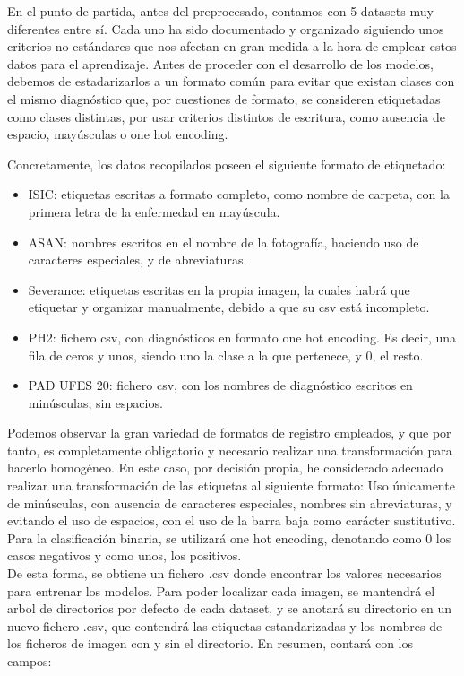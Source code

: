 En el punto de partida, antes del preprocesado, contamos con 5 datasets muy diferentes entre sí. Cada uno ha sido documentado y organizado siguiendo unos criterios no estándares que nos afectan en gran medida a la hora de emplear estos datos para el aprendizaje. Antes de proceder con el desarrollo de los modelos, debemos de estadarizarlos a un formato común para evitar que existan clases con el mismo diagnóstico que, por cuestiones de formato, se consideren etiquetadas como clases distintas, por usar criterios distintos de escritura, como ausencia de espacio, mayúsculas o one hot encoding. 

Concretamente, los datos recopilados poseen el siguiente formato de etiquetado:
\begin{itemize}
	\item ISIC: etiquetas escritas a formato completo, como nombre de carpeta, con la primera letra de la enfermedad en mayúscula.
	\item ASAN: nombres escritos en el nombre de la fotografía, haciendo uso de caracteres especiales, y de abreviaturas.
	\item Severance: etiquetas escritas en la propia imagen, la cuales habrá que etiquetar y organizar manualmente, debido a que su csv está incompleto.
	\item PH2: fichero csv, con diagnósticos en formato one hot encoding. Es decir, una fila de ceros y unos, siendo uno la clase a la que pertenece, y 0, el resto.
	\item PAD UFES 20: fichero csv, con los nombres de diagnóstico escritos en minúsculas, sin espacios.
\end{itemize}

Podemos observar la gran variedad de formatos de registro empleados, y que por tanto, es completamente obligatorio y necesario realizar una transformación para hacerlo homogéneo. En este caso, por decisión propia, he considerado adecuado realizar una transformación de las etiquetas al siguiente formato: Uso únicamente de minúsculas, con ausencia de caracteres especiales, nombres sin abreviaturas, y evitando el uso de espacios, con el uso de la barra baja como carácter sustitutivo. Para la clasificación binaria, se utilizará one hot encoding, denotando como 0 los casos negativos y como unos, los positivos.\\


De esta forma, se obtiene un fichero .csv donde encontrar los valores necesarios para entrenar los modelos. Para poder localizar cada imagen, se mantendrá el arbol de directorios por defecto de cada dataset, y se anotará su directorio en un nuevo fichero .csv, que contendrá las etiquetas estandarizadas y los nombres de los ficheros de imagen con y sin el directorio. En resumen, contará con los campos:

